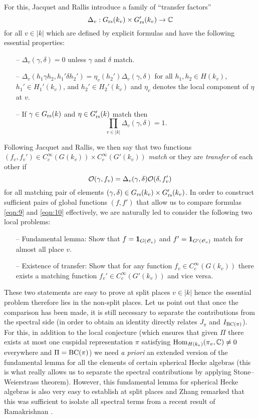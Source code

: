 For this, Jacquet and Rallis introduce a family of ``transfer factors''
\[
    \Delta_v: G_{\mathrm{rs}}(k_v) \times G_{\mathrm{rs}}'(k_v) \to \mathbb{C}
\]
for all $v \in |k|$ which are defined by explicit formulas and have the following essential properties:
\begin{itemize}
    \item[--] $\Delta_v(\gamma, \delta) = 0$ unless $\gamma$ and $\delta$ match.
    \item[--] $\Delta_v(h_1 \gamma h_2, h_1' \delta h_2') = \eta_v(h_2')\Delta_v(\gamma, \delta)$ for all $h_1, h_2 \in H(k_v)$, $h_1' \in H_1'(k_v)$, and $h_2' \in H_2'(k_v)$ and $\eta_v$ denotes the local component of $\eta$ at $v$.
    \item[--] If $\gamma \in G_{\mathrm{rs}}(k)$ and $\eta \in G_{\mathrm{rs}}'(k)$ match then
    \[
        \prod_{v \in |k|} \Delta_v(\gamma, \delta) = 1.
    \]
\end{itemize}

Following Jacquet and Rallis, we then say that two functions $(f_v, f_v') \in C_c^\infty(G(k_v)) \times C_c^\infty(G'(k_v))$ \emph{match} or they are \emph{transfer} of each other if
\[
    \mathcal{O}(\gamma, f_v) = \Delta_v(\gamma, \delta) \mathcal{O}(\delta, f_v')
\]
for all matching pair of elements $(\gamma, \delta) \in G_{\mathrm{rs}}(k_v) \times G_{\mathrm{rs}}'(k_v)$.
In order to construct sufficient pairs of global functions $(f, f')$ that allow us to compare formulas \eqref{eqn:9} and \eqref{eqn:10} effectively, we are naturally led to consider the following two local problems:
\begin{itemize}
    \item[--] Fundamental lemma: Show that $f = \mathbf{1}_{G(\mathscr{O}_v)}$ and $f' = \mathbf{1}_{G'(\mathscr{O}_v)}$ match for almost all place $v$.
    \item[--] Existence of transfer: Show that for any function $f_v \in C_c^\infty(G(k_v))$ there exists a matching function $f_v' \in C_c^\infty(G'(k_v))$ and vice versa.
\end{itemize}
These two statements are easy to prove at split places $v \in |k|$ hence the essential problem therefore lies in the non-split places.
Let us point out that once the comparison has been made, it is still necessary to separate the contributions from the spectral side (in order to obtain an identity directly relates $J_\pi$ and $I_{\mathrm{BC}(\pi)}$).
For this, in addition to the local conjecture (which ensures that given $\Pi$ there exists at most one cuspidal representation $\pi$ satisfying $\mathrm{Hom}_{H(k_v)}(\pi_v, \mathbb{C}) \neq 0$ everywhere and $\Pi = \mathrm{BC}(\pi)$) we need \emph{a priori} an extended version of the fundamental lemma for all the elements of certain spherical Hecke algebras (this is what really allows us to separate the spectral contributions by applying Stone--Weierstrass theorem).
However, this fundamental lemma for spherical Hecke algebras is also very easy to establish at split places and Zhang remarked that this was sufficient to isolate all spectral terms from a recent result of Ramakrishnan \cite{ramakrishnan2015mild}.
